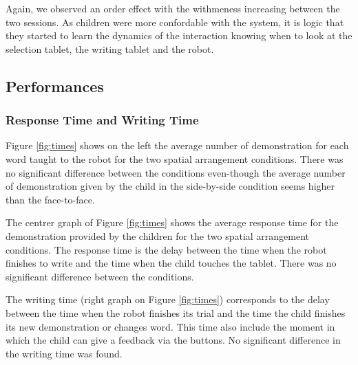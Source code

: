 \documentclass[letterpaper, 10 pt, conference]{ieeeconf}  %
\begin{document}
Again, we observed an order effect with the withmeness increasing between the two sessions. 
As children were more confordable with the system, it is logic that they started to learn the dynamics of the interaction knowing when to look at the selection tablet, the writing tablet and the robot. 

\subsection{Performances}
\subsubsection{Response Time and Writing Time}
Figure \ref{fig:times} shows on the left the average number of demonstration for each word taught to the robot for the two spatial arrangement conditions. 
There was no significant difference between the conditions even-though the average number of demonstration given by the child in the side-by-side condition seems higher than the face-to-face.

The centrer graph of Figure \ref{fig:times} shows the average response time for the demonstration provided by the children for the two spatial arrangement conditions.
The response time is the delay between the time when the robot finishes to write and the time when the child touches the tablet.
There was no significant difference between the conditions.
 
The writing time (right graph on Figure \ref{fig:times}) corresponds to the delay between the time when the robot finishes its trial and the time the child finishes its new demonstration or changes word. This time also include the moment in which the child can give a feedback via the buttons.
No significant difference in the writing time was found.
\end{document}
